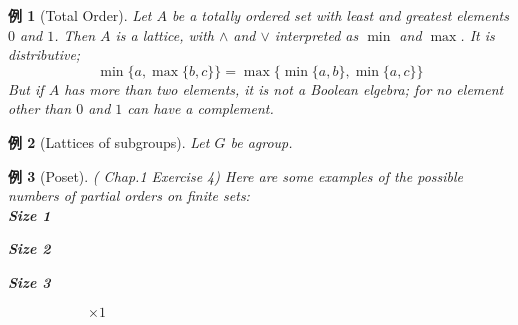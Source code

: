 \documentclass[a4j,12pt]{jarticle}
\numberwithin{equation}{section}
\newtheorem{example}{例}[section]
\newcommand{\itbf}[1]{\textit{\textbf{#1}}}
\begin{document}
\begin{example}[Total Order]
  Let $A$ be a totally ordered set with least and greatest elements $0$ and $1$. Then $A$ is a lattice, with $\wedge$ and $\vee$ interpreted as $\min$ and $\max$. It is distributive;
  \begin{equation}
    \min\{a, \max\{b,c\}\} = \max\{\min\{a,b\}, \min\{a,c\}\}
  \end{equation}
  But if $A$ has more than two elements, it is not a Boolean elgebra; for no element other than $0$ and $1$ can have a complement.
\end{example}
\begin{example}[Lattices of subgroups]
  Let $G$ be agroup.
\end{example}
\begin{example}[Poset]
  (\cite{Gratzer} Chap.1 Exercise 4)
  Here are some examples of the possible numbers of partial orders on finite sets:\\
  \itbf{Size 1}\\
  \begin{figure}[H]
  \end{figure}
  \itbf{Size 2}\\
  \begin{figure}[H]
  \end{figure}
  \itbf{Size 3}\\
  \begin{figure}[H]
    \begin{subfigure}{0.1\textwidth}
      \caption*{$\times 1$}
    \end{subfigure}      
    \begin{subfigure}{0.075\textwidth}
\end{subfigure}
\end{figure}
\end{example}
\end{document}
